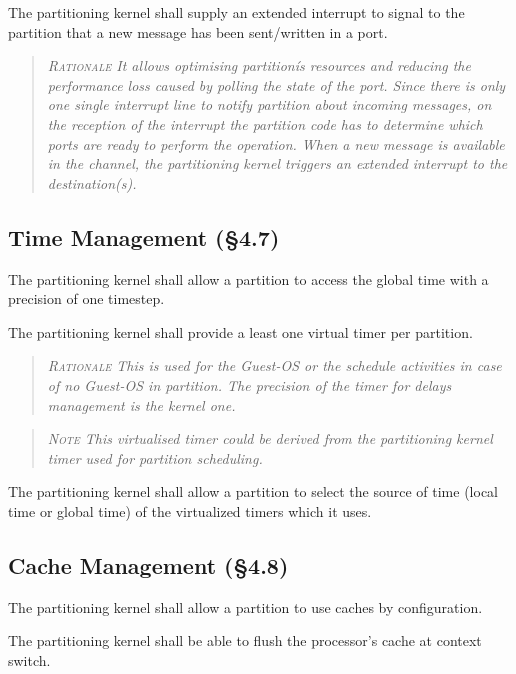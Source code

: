 The partitioning kernel shall supply an extended interrupt to signal to the partition that a new message has been sent/written in a port.
\begin{quote}\it
\textsc{Rationale}
It allows optimising partitionís resources and reducing the performance loss caused by polling the state of the port. Since there is only one single interrupt line to notify partition about incoming messages, on the reception of
the interrupt the partition code has to determine which ports are ready to perform the operation.
When a new message is available in the channel, the partitioning kernel triggers an extended interrupt to the destination(s).
\end{quote}

\subsection{Time Management (\S4.7)}

The partitioning kernel shall allow a partition to access the global time with a precision of one timestep.

The partitioning kernel shall provide a least one virtual timer per partition.
\begin{quote}\it
\textsc{Rationale}
This is used for the Guest-OS or the schedule activities in case of no Guest-OS in partition. The precision of the timer for delays management is the kernel one.
\end{quote}
\begin{quote}\it
\textsc{Note}
This virtualised timer could be derived from the partitioning kernel timer used for partition scheduling.
\end{quote}

The partitioning kernel shall allow a partition to select the source of time (local time or global time) of the virtualized timers which it uses.

\subsection{Cache Management (\S4.8)}

The partitioning kernel shall allow a partition to use caches by configuration.

The partitioning kernel shall be able to flush the processor's cache at context switch.

